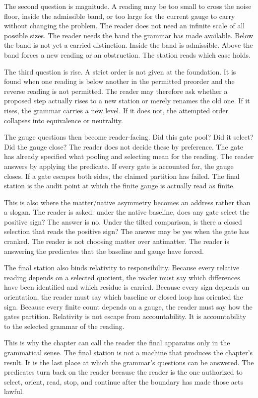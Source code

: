 The second question is magnitude. A reading may be too small to cross the
noise floor, inside the admissible band, or too large for the current gauge
to carry without changing the problem. The reader does not need an infinite
scale of all possible sizes. The reader needs the band the grammar has made
available. Below the band is not yet a carried distinction. Inside the band
is admissible. Above the band forces a new reading or an obstruction. The
station reads which case holds.

The third question is rise. A strict order is not given at the foundation.
It is found when one reading is below another in the permitted preorder and
the reverse reading is not permitted. The reader may therefore ask whether a
proposed step actually rises to a new station or merely renames the old one.
If it rises, the grammar carries a new level. If it does not, the attempted
order collapses into equivalence or neutrality.

The gauge questions then become reader-facing. Did this gate pool? Did it
select? Did the gauge close? The reader does not decide these by preference.
The gate has already specified what pooling and selecting mean for the
reading. The reader answers by applying the predicate. If every gate is
accounted for, the gauge closes. If a gate escapes both sides, the claimed
partition has failed. The final station is the audit point at which the
finite gauge is actually read as finite.

This is also where the matter/native asymmetry becomes an address rather
than a slogan. The reader is asked: under the native baseline, does any gate
select the positive sign? The answer is no. Under the tilted comparison, is
there a closed selection that reads the positive sign? The answer may be yes
when the gate has cranked. The reader is not choosing matter over antimatter.
The reader is answering the predicates that the baseline and gauge have
forced.

The final station also binds relativity to responsibility. Because every
relative reading depends on a selected quotient, the reader must say which
differences have been identified and which residue is carried. Because every
sign depends on orientation, the reader must say which baseline or closed
loop has oriented the sign. Because every finite count depends on a gauge,
the reader must say how the gates partition. Relativity is not escape from
accountability. It is accountability to the selected grammar of the reading.

This is why the chapter can call the reader the final apparatus only in the
grammatical sense. The final station is not a machine that produces the
chapter's result. It is the last place at which the grammar's questions can be answered.
The predicates turn back on the reader because the reader is the one
authorized to select, orient, read, stop, and continue after the boundary has
made those acts lawful.

